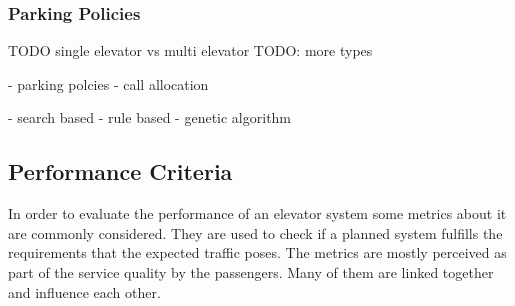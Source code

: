 \subsubsection{Parking Policies}

TODO
single elevator  vs multi elevator
TODO: more types

\autocite[][pp.~3--4,10]{beers2015arrivals}
- parking polcies
- call allocation

\autocite[][pp.~3--6]{axelsson2013strategies}
- search based
- rule based
- genetic algorithm




\subsection{Performance Criteria}
\label{sota:sec:perf}

In order to evaluate the performance of an elevator system some metrics about it are commonly considered.
They are used to check if a planned system fulfills the requirements that the expected traffic poses. 
The metrics are mostly perceived as part of the service quality by the passengers.
Many of them are linked together and influence each other.


